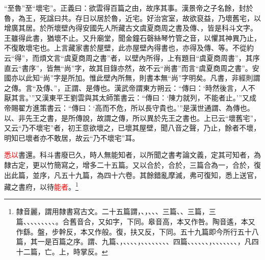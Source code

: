 {\noindent\shu{}\fzkt “至魯”至“壞宅”。正義曰：欲雲得百篇之由，故序其事。漢景帝之子名餘，封於魯，為王，死諡曰共。存日以居於魯，近宅。好治宮室，故欲裒益，乃壞舊宅，以增廣其居。於所壞壁內得安國先人所藏古文虞夏商周之書及傳、，皆是科斗文字。王雖得此書，猶壞不止。又升廟堂，聞金鐘石磬絲琴竹管之音，以懼其神異乃止，不復敢壞宅也。上言藏家書於屋壁，此亦屋壁內得書也，亦得及傳、等。不從約云“得”，而煩文言“虞夏商周之書”者，以壁內所得，上有題目“虞夏商周書”，其序直云“書序”，皆無“尚”字，故其目錄亦然，故不云“尚書”而言“虞夏商周之書”。安國亦以此知“尚”字是所加。惟此壁內所無，則書本無“尚”字明矣。凡書，非經則謂之傳。言“及傳、”，正謂、是傳也。漢武帝謂東方朔云：“傳曰：‘時然後言，人不厭其言。’”又漢東平王劉雲與其太師策書云：“傳曰：‘陳力就列，不能者止。’”又成帝賜翟方進策書云：“傳曰：‘高而不危，所以長守貴也。’”是漢世通謂、為傳也。以、非先王之書，是所傳說，故謂之傳，所以異於先王之書也。上已云“壞舊宅”，又云“乃不壞宅”者，初王意欲壞之，已壞其屋壁，聞八音之聲，乃止，餘者不壞，明知已壞者亦不敢居，故云“乃不壞宅”耳。 \par}

\textcolor{red}{悉以}書還。科斗書廢已久，時人無能知者，以所聞之書考論文義，定其可知者，為隸古定，更以竹簡寫之，增多二十五篇。又以合於，合於，三篇合為一，合於，復出此篇，並序，凡五十九篇，為四十六卷。其餘錯亂摩滅，弗可復知，悉上送官，藏之書府，以待\textcolor{red}{能者}。\footnote{隸音麗，謂用隸書寫古文。二十五篇謂，、，、、、三篇、、三篇，三篇、、、、、、、、、。合舊音合，又如字，下同。皋音高，本又作咎。陶音遙，本又作繇。盤，步幹反，本又作般。復，扶又反，下同。五十九篇即今所行五十八篇，其一是百篇之序。謂、九篇、，、、、、，、、、、、、、、四篇、、、、、、，、、、、、、、，凡四十二篇，亡。上，時掌反。}

